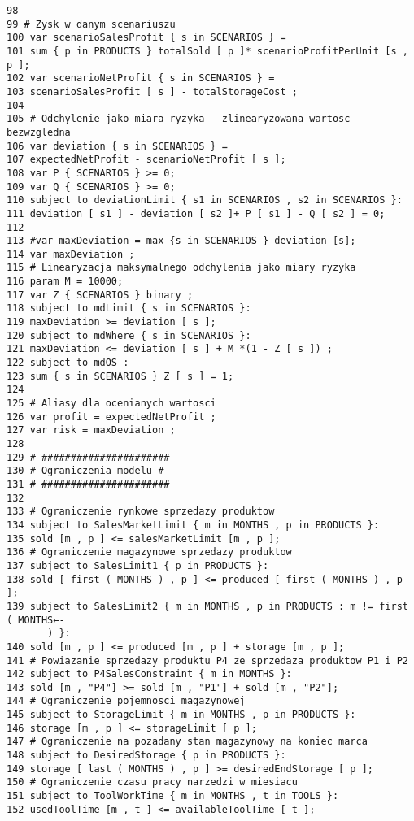\documentclass[12pt]{article}
\begin{document}
\begin{verbatim}
98
99 # Zysk w danym scenariuszu
100 var scenarioSalesProfit { s in SCENARIOS } =
101 sum { p in PRODUCTS } totalSold [ p ]* scenarioProfitPerUnit [s , p ];
102 var scenarioNetProfit { s in SCENARIOS } =
103 scenarioSalesProfit [ s ] - totalStorageCost ;
104
105 # Odchylenie jako miara ryzyka - zlinearyzowana wartosc bezwzgledna
106 var deviation { s in SCENARIOS } =
107 expectedNetProfit - scenarioNetProfit [ s ];
108 var P { SCENARIOS } >= 0;
109 var Q { SCENARIOS } >= 0;
110 subject to deviationLimit { s1 in SCENARIOS , s2 in SCENARIOS }:
111 deviation [ s1 ] - deviation [ s2 ]+ P [ s1 ] - Q [ s2 ] = 0;
112
113 #var maxDeviation = max {s in SCENARIOS } deviation [s];
114 var maxDeviation ;
115 # Linearyzacja maksymalnego odchylenia jako miary ryzyka
116 param M = 10000;
117 var Z { SCENARIOS } binary ;
118 subject to mdLimit { s in SCENARIOS }:
119 maxDeviation >= deviation [ s ];
120 subject to mdWhere { s in SCENARIOS }:
121 maxDeviation <= deviation [ s ] + M *(1 - Z [ s ]) ;
122 subject to mdOS :
123 sum { s in SCENARIOS } Z [ s ] = 1;
124
125 # Aliasy dla ocenianych wartosci
126 var profit = expectedNetProfit ;
127 var risk = maxDeviation ;
128
129 # ######################
130 # Ograniczenia modelu #
131 # ######################
132
133 # Ograniczenie rynkowe sprzedazy produktow
134 subject to SalesMarketLimit { m in MONTHS , p in PRODUCTS }:
135 sold [m , p ] <= salesMarketLimit [m , p ];
136 # Ograniczenie magazynowe sprzedazy produktow
137 subject to SalesLimit1 { p in PRODUCTS }:
138 sold [ first ( MONTHS ) , p ] <= produced [ first ( MONTHS ) , p ];
139 subject to SalesLimit2 { m in MONTHS , p in PRODUCTS : m != first ( MONTHS←-
       ) }:
140 sold [m , p ] <= produced [m , p ] + storage [m , p ];
141 # Powiazanie sprzedazy produktu P4 ze sprzedaza produktow P1 i P2
142 subject to P4SalesConstraint { m in MONTHS }:
143 sold [m , "P4"] >= sold [m , "P1"] + sold [m , "P2"];
144 # Ograniczenie pojemnosci magazynowej
145 subject to StorageLimit { m in MONTHS , p in PRODUCTS }:
146 storage [m , p ] <= storageLimit [ p ];
147 # Ograniczenie na pozadany stan magazynowy na koniec marca
148 subject to DesiredStorage { p in PRODUCTS }:
149 storage [ last ( MONTHS ) , p ] >= desiredEndStorage [ p ];
150 # Ograniczenie czasu pracy narzedzi w miesiacu
151 subject to ToolWorkTime { m in MONTHS , t in TOOLS }:
152 usedToolTime [m , t ] <= availableToolTime [ t ];
\end{verbatim}
\end{document}
